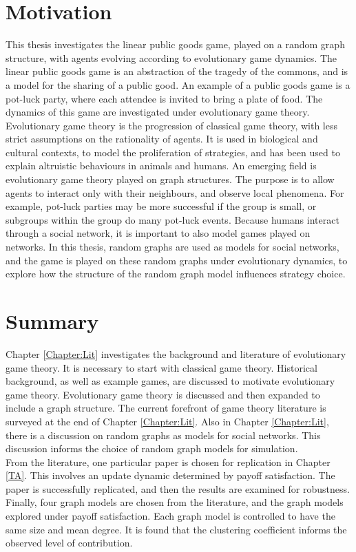 \section{Motivation}
This thesis investigates the linear public goods game, played on a random graph structure, with agents evolving according to evolutionary game dynamics. The linear public goods game is an abstraction of the tragedy of the commons, and is a model for the sharing of a public good. An example of a public goods game is a pot-luck party, where each attendee is invited to bring a plate of food. The dynamics of this game are investigated under evolutionary game theory. Evolutionary game theory is the progression of classical game theory, with less strict assumptions on the rationality of agents. It is used in biological and cultural contexts, to model the proliferation of strategies, and has been used to explain altruistic behaviours in animals and humans. An emerging field is evolutionary game theory played on graph structures. The purpose is to allow agents to interact only with their neighbours, and observe local phenomena. For example, pot-luck parties may be more successful if the group is small, or subgroups within the group do many pot-luck events. Because humans interact through a social network, it is important to also model games played on networks. In this thesis, random graphs are used as models for social networks, and the game is played on these random graphs under evolutionary dynamics, to explore how the structure of the random graph model influences strategy choice. 

\section{Summary}

Chapter \ref{Chapter:Lit} investigates the background and literature of evolutionary game theory. It is necessary to start with classical game theory. Historical background, as well as example games, are discussed to motivate evolutionary game theory. Evolutionary game theory is discussed and then expanded to include a graph structure. The current forefront of game theory literature is surveyed at the end of Chapter \ref{Chapter:Lit}. Also in Chapter \ref{Chapter:Lit}, there is a discussion on random graphs as models for social networks. This discussion informs the choice of random graph models for simulation. \\

From the literature, one particular paper is chosen for replication in Chapter \ref{TA}. This involves an update dynamic determined by payoff satisfaction. The paper is successfully replicated, and then the results are examined for robustness. Finally, four graph models are chosen from the literature, and the graph models explored under payoff satisfaction. Each graph model is controlled to have the same size and mean degree. It is found that the clustering coefficient informs the observed level of contribution. \\

